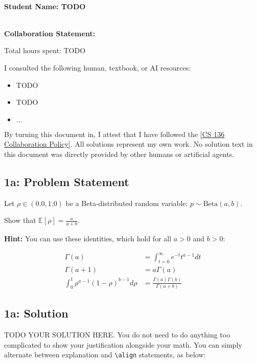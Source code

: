 \documentclass[10pt]{article}
\newcommand{\officialdirections}[1]{{\color{purple} #1}}
\begin{document}
~\\ %
{\Large{\bf Student Name: TODO}}

~\\ %
{\bf Collaboration Statement:}

Total hours spent: TODO

I consulted the following human, textbook, or AI resources:
\begin{itemize}
\item TODO
\item TODO
\item $\ldots$	
\end{itemize}

By turning this document in, I attest that I have followed the 
\href{https://www.cs.tufts.edu/cs/136/2025f/index.html#collaboration}{[CS 136 Collaboration Policy]}. All solutions represent my own work. No solution text in this document was directly provided by other humans or artificial agents. 

\tableofcontents

\newpage

\officialdirections{
\subsection*{1a: Problem Statement}

Let $\rho \in (0.0, 1.0)$ be a Beta-distributed random variable: $p \sim \text{Beta}(a, b)$. 

Show that $\mathbb{E}[ \rho ] = \frac{a}{a + b}$.

\textbf{Hint:} You can use these identities, which hold for all $a > 0$ and $b > 0$:

\begin{align}
\Gamma(a) &= \int_{t=0}^{\infty} e^{-t} t^{a-1} dt
\\
\Gamma(a+1) &= a \Gamma(a)
\\
\int_{0}^1 \rho^{a-1} (1-\rho)^{b-1} d\rho &= \frac{\Gamma(a)\Gamma(b)}{\Gamma(a+b)}
\end{align}
}

\subsection{1a: Solution}
TODO YOUR SOLUTION HERE. You do not need to do anything too complicated to show your justification alongside your math. You can simply alternate between explanation and \texttt{\textbackslash align} statements, as below:
\\
\end{document}
